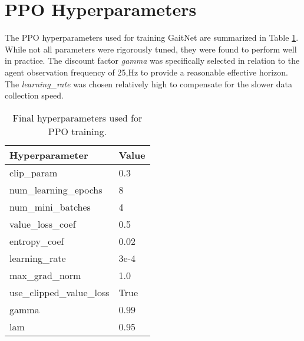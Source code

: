 \section{PPO Hyperparameters}

The PPO hyperparameters used for training GaitNet are summarized in
Table \ref{tab:ppo-hyperparams}. While not all parameters were
rigorously tuned, they were found to perform well in practice. The
discount factor \textit{gamma} was specifically selected in relation
to the agent observation frequency of 25,Hz to provide a reasonable
effective horizon. The \textit{learning\_rate} was chosen relatively
high to compensate for the slower data collection speed.

\begin{table}[h!]
  \centering
  \begin{tabular}{ll}
    \hline
    \textbf{Hyperparameter} & \textbf{Value} \\
    \hline
    clip\_param & 0.3 \\
    num\_learning\_epochs & 8 \\
    num\_mini\_batches & 4 \\
    value\_loss\_coef & 0.5 \\
    entropy\_coef & 0.02 \\
    learning\_rate & 3e-4 \\
    max\_grad\_norm & 1.0 \\
    use\_clipped\_value\_loss & True \\
    gamma & 0.99 \\
    lam & 0.95 \\
    \hline
  \end{tabular}
  \caption{Final hyperparameters used for PPO training.}
  \label{tab:ppo-hyperparams}
\end{table}
